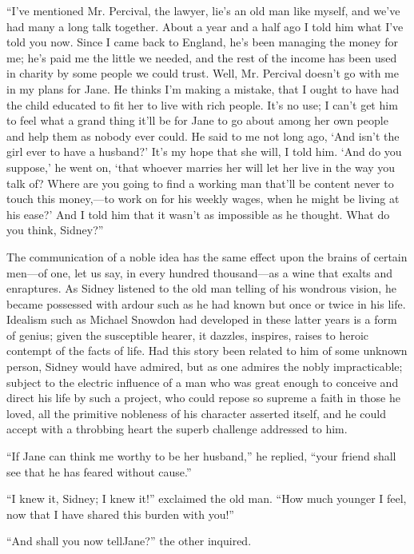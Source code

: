 ``I've mentioned Mr. Percival, the lawyer, lie's an old man like myself,
and we've had many a long talk together. About a year and a half ago I
told him what I've told you now. Since I came back to England, he's been
managing the money for me; he's paid me the little we needed, and the
rest of the income has been used in charity by some people we could
trust. Well, Mr. Percival doesn't go with me in my plans for
{\protect\hypertarget{144}{}{}}Jane. He thinks I'm making a mistake,
that I ought to have had the child educated to fit her to live with rich
people. It's no use; I can't get him to feel what a grand thing it'll be
for Jane to go about among her own people and help them as nobody ever
could. He said to me not long ago, `And isn't the girl ever to have a
husband?' It's my hope that she will, I told him. `And do you suppose,'
he went on, `that whoever marries her will let her live in the way you
talk of? Where are you going to find a working man that'll be content
never to touch this money,---to work on for his weekly wages, when he
might be living at his ease?' And I told him that it wasn't as
impossible as he thought. What do you think, Sidney?''

The communication of a noble idea has the same effect upon the brains of
certain men---of one, let us say, in every hundred thousand---as a wine
that exalts and enraptures. As Sidney listened to the old man telling of
his wondrous vision, he became possessed with ardour such as he had
known {\protect\hypertarget{145}{}{}}but once or twice in his life.
Idealism such as Michael Snowdon had developed in these latter years is
a form of genius; given the susceptible hearer, it dazzles, inspires,
raises to heroic contempt of the facts of life. Had this story been
related to him of some unknown person, Sidney would have admired, but as
one admires the nobly impracticable; subject to the electric influence
of a man who was great enough to conceive and direct his life by such a
project, who could repose so supreme a faith in those he loved, all the
primitive nobleness of his character asserted itself, and he could
accept with a throbbing heart the superb challenge addressed to him.

``If Jane can think me worthy to be her husband,'' he replied, ``your
friend shall see that he has feared without cause.''

``I knew it, Sidney; I knew it!'' exclaimed the old man. ``How much
younger I feel, now that I have shared this burden with you!''

``And shall you now tellJane?'' the other inquired.

